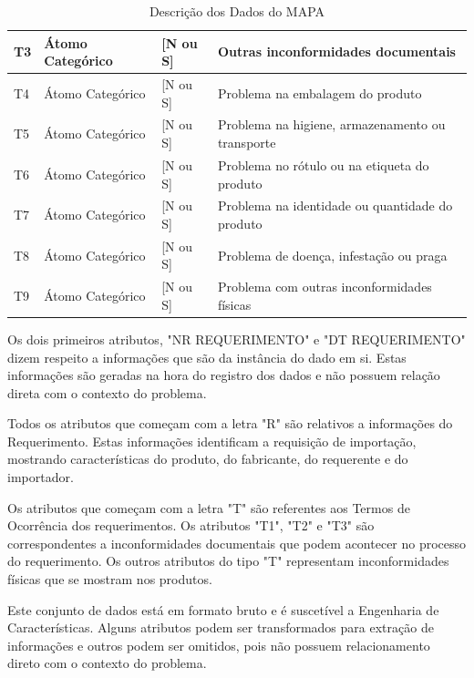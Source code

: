 \begin{table}[h]
{\begin{tabular}{|l|l|l|l|}
T3              & Átomo Categórico         & {[}N ou S{]}           & Outras inconformidades documentais                                                         \\ \hline
T4              & Átomo Categórico         & {[}N ou S{]}           & Problema na embalagem do produto                                                           \\ \hline
T5              & Átomo Categórico         & {[}N ou S{]}           & Problema na higiene, armazenamento ou transporte
\\ \hline
T6              & Átomo Categórico         & {[}N ou S{]}           & Problema no rótulo ou na etiqueta do produto                                               \\ \hline
T7              & Átomo Categórico         & {[}N ou S{]}           & Problema na identidade ou quantidade do produto                                            \\ \hline
T8              & Átomo Categórico         & {[}N ou S{]}           & Problema de doença, infestação ou praga                                                    \\ \hline
T9              & Átomo Categórico         & {[}N ou S{]}           & Problema com outras inconformidades físicas                                                \\ \hline
\end{tabular}
}
\caption{Descrição dos Dados do MAPA}
\label{my-label}
\end{table}

Os dois primeiros atributos, "NR REQUERIMENTO" e "DT REQUERIMENTO" dizem respeito a informações que são da instância do dado em si. Estas informações são geradas na hora do registro dos dados e não possuem relação direta com o contexto do problema.

Todos os atributos que começam com a letra "R" são relativos a informações do Requerimento. Estas informações identificam a requisição de importação, mostrando características do produto, do fabricante, do requerente e do importador.

Os atributos que começam com a letra "T" são referentes aos Termos de Ocorrência dos requerimentos. Os atributos "T1", "T2" e "T3" são correspondentes a inconformidades documentais que podem acontecer no processo do requerimento. Os outros atributos do tipo "T" representam inconformidades físicas que se mostram nos produtos.

Este conjunto de dados está em formato bruto e é suscetível a Engenharia de Características. Alguns atributos podem ser transformados para extração de informações e outros podem ser omitidos, pois não possuem relacionamento direto com o contexto do problema. 

























